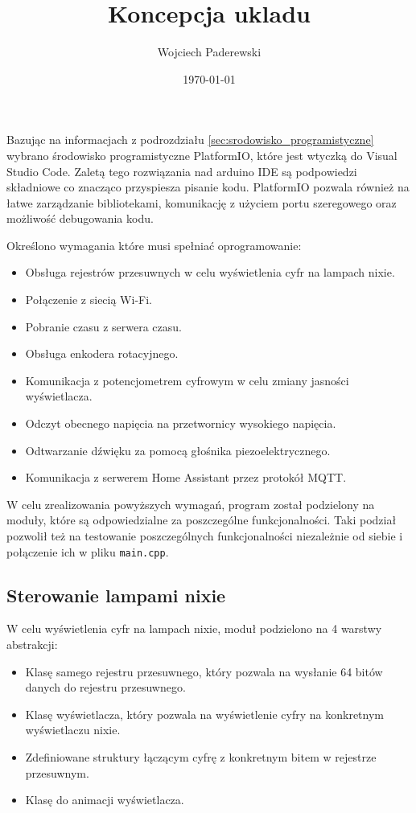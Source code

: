 \documentclass[../main.tex]{subfiles}
\author{Wojciech Paderewski}
\date{\today}
\title{Koncepcja ukladu}
\begin{document}
Bazując na informacjach z podrozdziału \ref{sec:srodowisko_programistyczne} wybrano środowisko programistyczne PlatformIO, które jest wtyczką do Visual Studio Code. 
Zaletą tego rozwiązania nad arduino IDE są podpowiedzi składniowe co znacząco przyspiesza pisanie kodu.
PlatformIO pozwala również na łatwe zarządzanie bibliotekami, komunikację z użyciem portu szeregowego oraz możliwość debugowania kodu.

Określono wymagania które musi spełniać oprogramowanie:
\begin{itemize}
  \item Obsługa rejestrów przesuwnych w celu wyświetlenia cyfr na lampach nixie.
  \item Połączenie z siecią Wi-Fi.
  \item Pobranie czasu z serwera czasu.
  \item Obsługa enkodera rotacyjnego.
  \item Komunikacja z potencjometrem cyfrowym w celu zmiany jasności wyświetlacza.
  \item Odczyt obecnego napięcia na przetwornicy wysokiego napięcia.
  \item Odtwarzanie dźwięku za pomocą głośnika piezoelektrycznego.
  \item Komunikacja z serwerem Home Assistant przez protokół MQTT.
\end{itemize}

W celu zrealizowania powyższych wymagań, program został podzielony na moduły, które są odpowiedzialne za poszczególne funkcjonalności.
Taki podział pozwolił też na testowanie poszczególnych funkcjonalności niezależnie od siebie i połączenie ich w pliku \texttt{main.cpp}.

\subsection{Sterowanie lampami nixie}
W celu wyświetlenia cyfr na lampach nixie, moduł podzielono na 4 warstwy abstrakcji:
\begin{itemize}
  \item Klasę samego rejestru przesuwnego, który pozwala na wysłanie 64 bitów danych do rejestru przesuwnego.
  \item Klasę wyświetlacza, który pozwala na wyświetlenie cyfry na konkretnym wyświetlaczu nixie.
  \item Zdefiniowane struktury łączącym cyfrę z konkretnym bitem w rejestrze przesuwnym.
  \item Klasę do animacji wyświetlacza.
\end{itemize}
\end{document}
